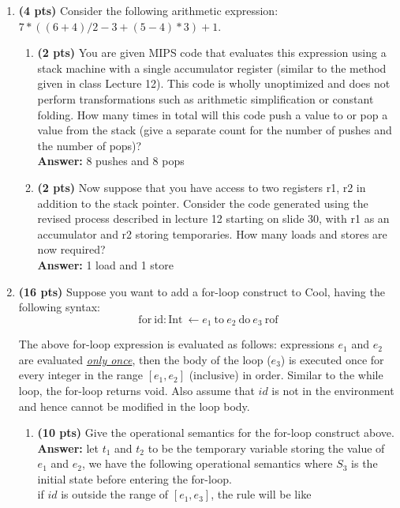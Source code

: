\documentclass[11pt]{article}
\begin{document}
\begin{enumerate}
\begin{enumerate}
   \newpage
    
  \end{enumerate}
  
  \item \textbf{(4 pts)} Consider the following arithmetic expression: $7*((6+4)/2 - 3 + (5-4)*3) + 1$.
  
  \begin{enumerate}
    \item \textbf{(2 pts)} You are given MIPS code that evaluates this expression using a stack machine with a single accumulator register (similar to the method given in class Lecture 12). This code is wholly unoptimized and does not perform transformations such as arithmetic simplification or constant folding. How many times in total will this code push a value to or pop a value from the stack (give a separate count for the number of pushes and the number of pops)?\\
    \textbf{Answer:} 
    8 pushes and 8 pops
    
    \item \textbf{(2 pts)} Now suppose that you have access to two registers r1, r2 in addition to the stack pointer. Consider the code generated using the revised process described in lecture 12 starting on slide 30, with r1 as an accumulator and r2 storing temporaries. How many loads and stores are now required?\\
    \textbf{Answer:} 
    1 load and 1 store
  \end{enumerate}
  \newpage
    
  \item \textbf{(16 pts)} Suppose you want to add a for-loop construct to Cool, having the following syntax:\\
  
  $$\mbox{for}\ \mbox{id}: \mbox{Int}\ \leftarrow e_1\ \mbox{to}\ e_2\ \mbox{do}\ e_3\ \mbox{rof}$$ 
  
  The above for-loop expression is evaluated as follows: expressions $e_1$ and $e_2$ are evaluated \underline{\emph{only once}}, then the body of the loop ($e_3$) is executed once for every integer in the range $[e_1, e_2]$ (inclusive) in order. Similar to the while loop, the for-loop returns void. Also assume that $id$ is not in the environment and hence cannot be modified in the loop body.
  
   \begin{enumerate}
    \item \textbf{(10 pts)} Give the operational semantics for the for-loop construct above.\\
    \textbf{Answer:} 
        let $t_1$ and $t_2$ to be the temporary variable storing the value of $e_1$ and $e_2$, we have the following operational semantics where $S_3$ is the initial state before entering the for-loop. \\
    if $id$ is outside the range of $[e_1,e_3]$, the rule will be like
    

\end{enumerate}
\end{enumerate}
\end{document}
